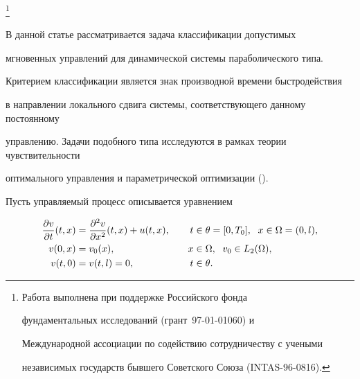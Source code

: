 \thanks{Работа выполнена при поддержке Российского фонда


фундаментальных исследований (грант \No\,97-01-01060) и 


Международной ассоциации по содействию сотрудничеству с учеными


независимых государств бывшего Советского Союза (INTAS-96-0816).}


\date{}







\pagestyle{plain} %







\maketitle


\label{begin}





В данной статье рассматривается задача классификации допустимых 


мгновенных управлений для динамической системы параболического типа. 


Критерием классификации является знак производной времени быстродействия


в направлении локального сдвига системы, соответствующего данному постоянному


управлению. Задачи подобного типа исследуются в рамках теории чувствительности 


оптимального управления и параметрической оптимизации (\cite{D}).





Пусть управляемый процесс описывается уравнением 


\begin{alignat}{2}


\frac{\partial v}{\partial t} (t,x)&=


\frac{\partial^2v}{\partial x^2}(t,x)+u(t,x), &\quad 


t&\in\theta=[0,T_0],\ \; x\in\Omega=(0,l),\notag \\


\label{1}


v(0,x)&=v_0(x), &\quad  x&\in\Omega,\ \; v_0\in L_2(\Omega),\\


v(t,0)&=v(t,l)=0, &\quad  t&\in\theta.\notag


\end{alignat}



